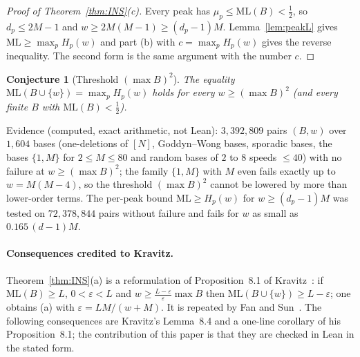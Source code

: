 \documentclass[11pt]{article}
\newtheorem{conjecture}[theorem]{Conjecture}
\theoremstyle{definition}
\theoremstyle{remark}
\newcommand{\ML}{\mathrm{ML}}
\begin{document}
\begin{proof}[Proof of Theorem~\ref{thm:INS}(c)]
Every peak has $\mu_p\le\ML(B)<\frac12$, so $d_p\le2M-1$ and $w\ge2M(M-1)\ge(d_p-1)M$. Lemma~\ref{lem:peakL} gives $\ML\ge\max_pH_p(w)$ and part (b) with $c=\max_pH_p(w)$ gives the reverse inequality. The second form is the same argument with the number $c$.
\end{proof}

\begin{conjecture}[Threshold $(\max B)^2$]\label{conj:M2}
The equality $\ML(B\cup\{w\})=\max_pH_p(w)$ holds for every $w\ge(\max B)^2$ (and every finite $B$ with $\ML(B)<\frac12$).
\end{conjecture}
Evidence (computed, exact arithmetic, not Lean): $3{,}392{,}809$ pairs $(B,w)$ over $1{,}604$ bases (one-deletions of $[N]$, Goddyn--Wong bases, sporadic bases, the bases $\{1,M\}$ for $2\le M\le80$ and random bases of $2$ to $8$ speeds $\le40$) with no failure at $w\ge(\max B)^2$; the family $\{1,M\}$ with $M$ even fails exactly up to $w=M(M-4)$, so the threshold $(\max B)^2$ cannot be lowered by more than lower-order terms. The per-peak bound $\ML\ge H_p(w)$ for $w\ge(d_p-1)M$ was tested on $72{,}378{,}844$ pairs without failure and fails for $w$ as small as $0.165\,(d-1)M$.

\paragraph{Consequences credited to Kravitz.}
Theorem~\ref{thm:INS}(a) is a reformulation of Proposition~8.1 of Kravitz~\cite[p.~14]{K}: if $\ML(B)\ge L$, $0<\varepsilon<L$ and $w\ge\frac{L-\varepsilon}{\varepsilon}\max B$ then $\ML(B\cup\{w\})\ge L-\varepsilon$; one obtains (a) with $\varepsilon=LM/(w+M)$. It is repeated by Fan and Sun~\cite[Lemma~3.3]{FS}. The following consequences are Kravitz's Lemma~8.4 and a one-line corollary of his Proposition~8.1; the contribution of this paper is that they are checked in Lean in the stated form.
\end{document}

